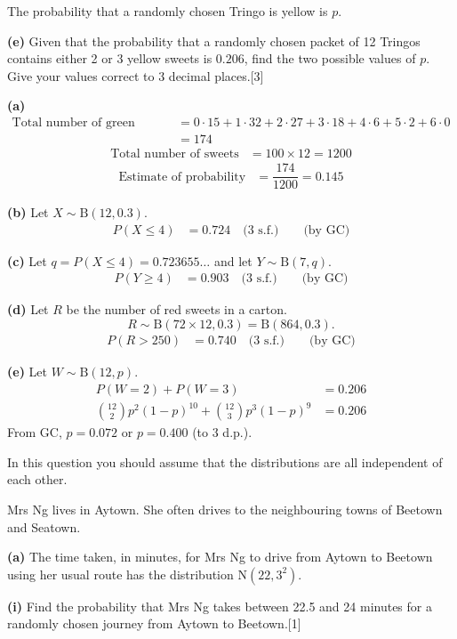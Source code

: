 \documentclass[a4paper,11pt,oneside]{article}
\newcommand{\Qhead}[1]{\par\needspace{14\baselineskip}\medskip\noindent{\large\bfseries #1}\par\smallskip}
\newcommand{\partlabel}[1]{\par\needspace{3\baselineskip}\smallskip\noindent\textbf{#1}\quad}
\newcommand{\mk}[1]{\hfill[#1]}
\begin{document}
The probability that a randomly chosen Tringo is yellow is $p$.
\partlabel{(e)}
Given that the probability that a randomly chosen packet of 12 Tringos contains either 2 or 3 yellow sweets is $0.206$, find the two possible values of $p$. Give your values correct to 3 decimal places.\mk{3}

\begin{solbox}
\partlabel{(a)}
\begin{align*}
\text{Total number of green sweets}
&= 0\cdot 15 + 1\cdot 32 + 2\cdot 27 + 3\cdot 18 + 4\cdot 6 + 5\cdot 2 + 6\cdot 0\\
&= 174
\end{align*}
\begin{align*}
\text{Total number of sweets} &= 100\times 12 = 1200
\end{align*}
\begin{align*}
\text{Estimate of probability} &= \dfrac{174}{1200} = 0.145
\end{align*}
\partlabel{(b)}
Let $X\sim\mathrm{B}(12,0.3)$.
\begin{align*}
P(X\le 4) &= 0.724\quad\text{(3 s.f.)}\qquad\text{(by GC)}
\end{align*}
\partlabel{(c)}
Let $q = P(X\le 4) = 0.723655\ldots$ and let $Y\sim\mathrm{B}(7,q)$.
\begin{align*}
P(Y\ge 4) &= 0.903\quad\text{(3 s.f.)}\qquad\text{(by GC)}
\end{align*}
\partlabel{(d)}
Let $R$ be the number of red sweets in a carton.
\[
R\sim\mathrm{B}(72\times12,0.3)=\mathrm{B}(864,0.3).
\]
\begin{align*}
P(R>250)&=0.740\quad\text{(3 s.f.)}\qquad\text{(by GC)}
\end{align*}
\partlabel{(e)}
Let $W\sim\mathrm{B}(12,p)$.
\begin{align*}
P(W=2)+P(W=3) &= 0.206\\
\binom{12}{2}p^2(1-p)^{10} + \binom{12}{3}p^3(1-p)^9 &= 0.206
\end{align*}
From GC, $p = 0.072$ or $p = 0.400$ (to 3 d.p.).
\end{solbox}
\clearpage
\Qhead{10}
In this question you should assume that the distributions are all independent of each other.

Mrs Ng lives in Aytown. She often drives to the neighbouring towns of Beetown and Seatown.
\partlabel{(a)}
The time taken, in minutes, for Mrs Ng to drive from Aytown to Beetown using her usual route has the distribution $\mathrm{N}(22,3^2)$.
\partlabel{(i)}
Find the probability that Mrs Ng takes between 22.5 and 24 minutes for a randomly chosen journey from Aytown to Beetown.\mk{1}
\end{document}
